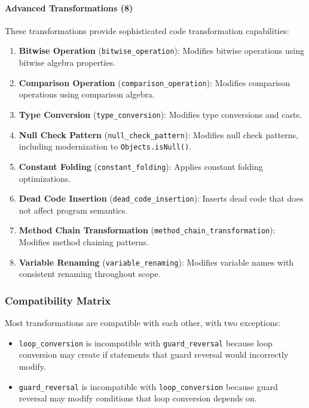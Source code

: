 \documentclass[acmsmall,screen,review,anonymous]{acmart}
\begin{document}
\paragraph{Advanced Transformations (8)}
These transformations provide sophisticated code transformation capabilities:

\begin{enumerate}
    \item \textbf{Bitwise Operation} (\texttt{bitwise\_operation}): Modifies bitwise operations using bitwise algebra properties.
    
    \item \textbf{Comparison Operation} (\texttt{comparison\_operation}): Modifies comparison operations using comparison algebra.
    
    \item \textbf{Type Conversion} (\texttt{type\_conversion}): Modifies type conversions and casts.
    
    \item \textbf{Null Check Pattern} (\texttt{null\_check\_pattern}): Modifies null check patterns, including modernization to \texttt{Objects.isNull()}.
    
    \item \textbf{Constant Folding} (\texttt{constant\_folding}): Applies constant folding optimizations.
    
    \item \textbf{Dead Code Insertion} (\texttt{dead\_code\_insertion}): Inserts dead code that does not affect program semantics.
    
    \item \textbf{Method Chain Transformation} (\texttt{method\_chain\_transformation}): Modifies method chaining patterns.
    
    \item \textbf{Variable Renaming} (\texttt{variable\_renaming}): Modifies variable names with consistent renaming throughout scope.
\end{enumerate}

\subsubsection{Compatibility Matrix}
\label{sec:compatibility}

Most transformations are compatible with each other, with two exceptions:
\begin{itemize}
    \item \texttt{loop\_conversion} is incompatible with \texttt{guard\_reversal} because loop conversion may create if statements that guard reversal would incorrectly modify.
    \item \texttt{guard\_reversal} is incompatible with \texttt{loop\_conversion} because guard reversal may modify conditions that loop conversion depends on.
\end{itemize}
\end{document}
